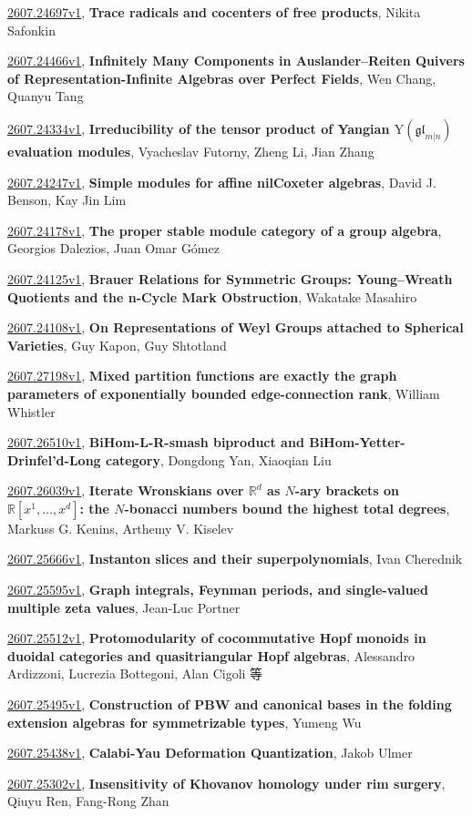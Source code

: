 \documentclass[9pt, a4paper]{article}
\theoremstyle{plain}
\theoremstyle{definition}
\theoremstyle{remark}
\newcommand{\arxiv}[3]{\href{https://arxiv.org/abs/#1}{#1}, \textbf{\textcolor{arxivblue}{#2}}, #3}
\begin{document}
\arxiv{2607.24697v1}{Trace radicals and cocenters of free products}{Nikita Safonkin}

\arxiv{2607.24466v1}{Infinitely Many Components in Auslander--Reiten Quivers of Representation-Infinite Algebras over Perfect Fields}{Wen Chang, Quanyu Tang}

\arxiv{2607.24334v1}{Irreducibility of the tensor product of Yangian \( \mathrm{Y}(\mathfrak{gl}_{m|n}) \) evaluation modules}{Vyacheslav Futorny, Zheng Li, Jian Zhang}

\arxiv{2607.24247v1}{Simple modules for affine nilCoxeter algebras}{David J. Benson, Kay Jin Lim}

\arxiv{2607.24178v1}{The proper stable module category of a group algebra}{Georgios Dalezios, Juan Omar Gómez}

\arxiv{2607.24125v1}{Brauer Relations for Symmetric Groups: Young--Wreath Quotients and the n-Cycle Mark Obstruction}{Wakatake Masahiro}

\arxiv{2607.24108v1}{On Representations of Weyl Groups attached to Spherical Varieties}{Guy Kapon, Guy Shtotland}

\arxiv{2607.27198v1}{Mixed partition functions are exactly the graph parameters of exponentially bounded edge-connection rank}{William Whistler}

\arxiv{2607.26510v1}{BiHom-L-R-smash biproduct and BiHom-Yetter-Drinfel'd-Long category}{Dongdong Yan, Xiaoqian Liu}

\arxiv{2607.26039v1}{Iterate Wronskians over $\mathbb{R}^d$ as $N$-ary brackets on $\mathbb{R}[x^1,\ldots,x^d]$: the $N$-bonacci numbers bound the highest total degrees}{Markuss G. Kenins, Arthemy V. Kiselev}

\arxiv{2607.25666v1}{Instanton slices and their superpolynomials}{Ivan Cherednik}

\arxiv{2607.25595v1}{Graph integrals, Feynman periods, and single-valued multiple zeta values}{Jean-Luc Portner}

\arxiv{2607.25512v1}{Protomodularity of cocommutative Hopf monoids in duoidal categories and quasitriangular Hopf algebras}{Alessandro Ardizzoni, Lucrezia Bottegoni, Alan Cigoli 等}

\arxiv{2607.25495v1}{Construction of PBW and canonical bases in the folding extension algebras for symmetrizable types}{Yumeng Wu}

\arxiv{2607.25438v1}{Calabi-Yau Deformation Quantization}{Jakob Ulmer}

\arxiv{2607.25302v1}{Insensitivity of Khovanov homology under rim surgery}{Qiuyu Ren, Fang-Rong Zhan}
\end{document}
